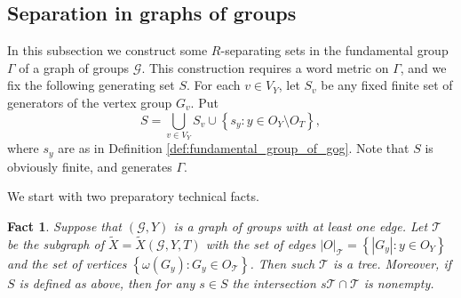 \documentclass[12pt, a4paper]{article}
\newcommand{\8}{\infty}
\newcommand{\abs}[1]{\left| #1 \right|}
\newcommand{\set}[1]{\left\{ #1 \right\}}
\theoremstyle{break}
\newtheorem{fact}[thm]{Fact}
\theoremstyle{defbreak}
\newcommand{\wtl}[1]{\widetilde{#1}}
\begin{document}
\subsection{Separation in graphs of groups} \label{Subsection:separation_in_group}

In this subsection we construct some $R$-separating sets in the fundamental group $\Gamma$ of a graph of groups $\mathcal{G}$. This construction requires a word metric on $\Gamma$,
and we fix the following generating set $S$. 
For each $v\in V_Y$, let $S_v$ be any fixed finite set of generators of the vertex group $G_v$. Put
$$S = \bigcup_{v\in V_Y}S_v\cup\set{s_y:y\in O_Y\setminus O_T},$$
where $s_y$ are as in Definition \ref{def:fundamental_group_of_gog}.
Note that $S$ is obviously finite, and generates $\Gamma$. 


We start with two preparatory technical facts.
\medskip

\begin{fact} \label{fact:tiling-tree}
    Suppose that $(\mathcal{G}, Y)$ is a graph of groups with at least one edge. Let $\mathcal{T}$ be the subgraph of $\wtl{X}=\wtl{X}(\mathcal{G}, Y, T)$ with the set of edges $\abs{O}_{\mathcal{T}} = \set{\abs{G_y}:y\in O_Y}$ and the set of vertices $\set{\omega(G_y): G_y\in O_{\mathcal{T}}}$. Then such $\mathcal{T}$ is a tree. Moreover, if $S$ is defined as above, then for any $s\in S$ the intersection $s\mathcal{T}\cap \mathcal{T}$ is nonempty.
\end{fact}
\end{document}
